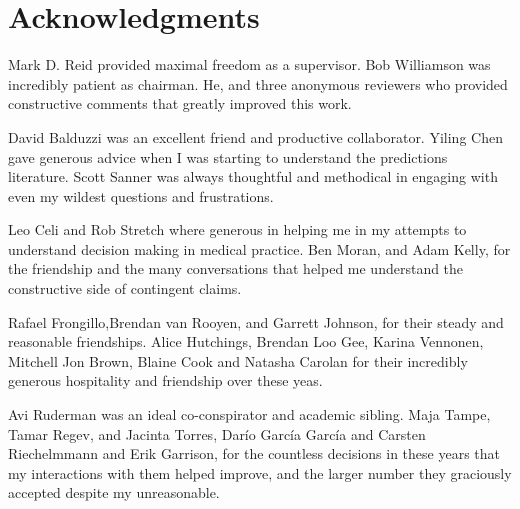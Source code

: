 \chapter*{Acknowledgments}

Mark D. Reid provided maximal freedom as a supervisor.
Bob Williamson was incredibly patient as chairman.
He, and three anonymous reviewers who provided constructive comments that greatly improved this work.  

David Balduzzi was an excellent friend and productive collaborator.
Yiling Chen gave generous advice when I was starting to understand the predictions literature.
Scott Sanner was always thoughtful and methodical in engaging with even my wildest questions and frustrations.


Leo Celi and Rob Stretch where generous in helping me in my attempts to understand decision making in medical practice.
Ben Moran, and Adam Kelly, for the friendship and the many conversations that helped me understand the constructive side of contingent claims.

Rafael Frongillo,Brendan van Rooyen, and Garrett Johnson, for their steady and reasonable friendships.
Alice Hutchings, Brendan Loo Gee, Karina Vennonen, Mitchell Jon Brown, Blaine Cook and Natasha Carolan for their incredibly generous hospitality and friendship over these yeas.

Avi Ruderman was an ideal co-conspirator and academic sibling. 
Maja Tampe, Tamar Regev, and Jacinta Torres, Dar\'io Garc\'ia Garc\'ia and Carsten Riechelmmann and Erik Garrison, for the countless decisions in these years that my interactions with them helped improve, and the larger number they graciously accepted despite my unreasonable. 


